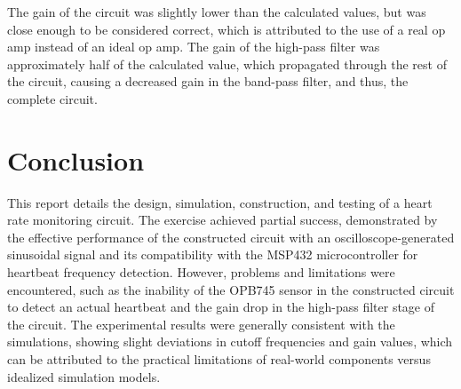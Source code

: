 \documentclass[CMPE]{KGCOEReport}
\begin{document}
The gain of the circuit was slightly lower than the calculated values, but was close enough to be considered correct, which is attributed to the use of a real op amp instead of an ideal op amp. The gain of the high-pass filter was approximately half of the calculated value, which propagated through the rest of the circuit, causing a decreased gain in the band-pass filter, and thus, the complete circuit.

\section*{Conclusion}

This report details the design, simulation, construction, and testing of a heart rate monitoring circuit. The exercise achieved partial success, demonstrated by the effective performance of the constructed circuit with an oscilloscope-generated sinusoidal signal and its compatibility with the MSP432 microcontroller for heartbeat frequency detection. However, problems and limitations were encountered, such as the inability of the OPB745 sensor in the constructed circuit to detect an actual heartbeat and the gain drop in the high-pass filter stage of the circuit. The experimental results were generally consistent with the simulations, showing slight deviations in cutoff frequencies and gain values, which can be attributed to the practical limitations of real-world components versus idealized simulation models.
\end{document}
